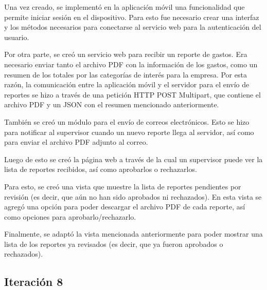Una vez creado, se implementó en la aplicación móvil una funcionalidad que permite iniciar sesión en el dispositivo. Para esto fue necesario crear una interfaz y los métodos necesarios para conectarse al servicio web para la autenticación del usuario.

Por otra parte, se creó un servicio web para recibir un reporte de gastos. Era necesario enviar tanto el archivo PDF con la información de los gastos, como un resumen de los totales por las categorías de interés para la empresa. Por esta razón, la comunicación entre la aplicación móvil y el servidor para el envío de reportes se hizo a través de una petición HTTP POST Multipart, que contiene el archivo PDF y un JSON con el resumen mencionado anteriormente.

También se creó un módulo para el envío de correos electrónicos. Esto se hizo para notificar al supervisor cuando un nuevo reporte llega al servidor, así como para enviar el archivo PDF adjunto al correo.

Luego de esto se creó la página web a través de la cual un supervisor puede ver la lista de reportes recibidos, así como aprobarlos o rechazarlos.

Para esto, se creó una vista que muestre la lista de reportes pendientes por revisión (es decir, que aún no han sido aprobados ni rechazados). En esta vista se agregó una opción para poder descargar el archivo PDF de cada reporte, así como opciones para aprobarlo/rechazarlo.

Finalmente, se adaptó la vista mencionada anteriormente para poder mostrar una lista de los reportes ya revisados (es decir, que ya fueron aprobados o rechazados).

\subsection{Iteración 8}